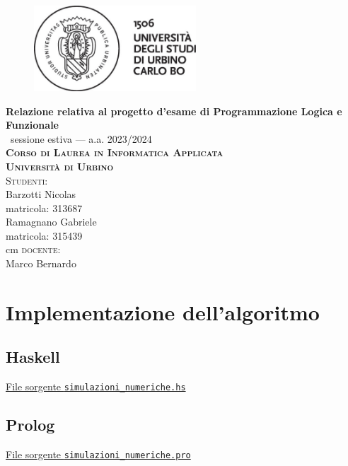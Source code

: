 \documentclass{article}
\begin{document}

\begin{titlepage}
	\centering
	\begin{figure}
	\vspace{2.5cm}
    \centerline{\includegraphics[height=3.2cm]{Resources/logo-uniurb-2016.jpg.eps}}
    \end{figure}
	\vspace*{\baselineskip}
	\LARGE{\bfseries Relazione relativa al progetto d'esame di Programmazione Logica e Funzionale }\\
	\Large{\ sessione estiva --- a.a. 2023/2024}\\ [0.6cm]
	\large{\textbf{\scshape{Corso di Laurea in Informatica Applicata\\ Università di Urbino}}}\\[3cm]
		{\large {\scshape Studenti:}\\[0.3cm] Barzotti Nicolas\\matricola: 313687\\
        Ramagnano Gabriele\\matricola: 315439}\\
         cm
	     \large{{\scshape docente:} \\[0.3cm] Marco Bernardo}\\[1.3cm]
	
\end{titlepage}

\index 
\tableofcontents

   
 

%

\section{Implementazione dell'algoritmo}

\subsection{Haskell}
\underline{File sorgente \texttt{simulazioni\_numeriche.hs}} 


\newpage
\subsection{Prolog}
\underline{File sorgente \texttt{simulazioni\_numeriche.pro}}



\end{document}
